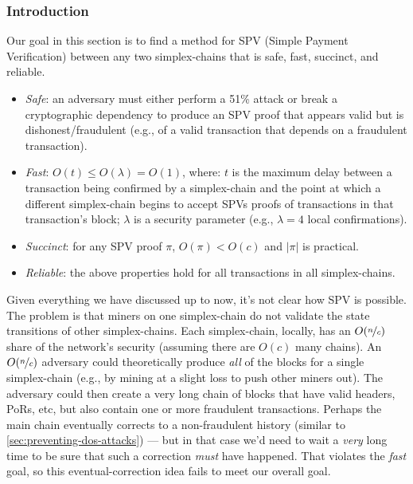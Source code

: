 
%
%

\subsubsection{Introduction}

Our goal in this section is to find a method for SPV (Simple Payment Verification) between any two simplex-chains that is safe, fast, succinct, and reliable.
\begin{itemize}
    \item \emph{Safe}: an adversary must either perform a 51\% attack or break a cryptographic dependency to produce an SPV proof that appears valid but is dishonest/fraudulent (e.g., of a valid transaction that depends on a fraudulent transaction).
    \item \emph{Fast}: $O(t) \le O(\lambda) = O(1)$, where: $t$ is the maximum delay between a transaction being confirmed by a simplex-chain and the point at which a different simplex-chain begins to accept SPVs proofs of transactions in that transaction's block; $\lambda$ is a security parameter (e.g., $\lambda = 4$ local confirmations).
    \item \emph{Succinct}: for any SPV proof $\pi$, $O(\pi) < O(c)$ and $|\pi|$ is practical.
    \item \emph{Reliable}: the above properties hold for all transactions in all simplex-chains.
\end{itemize}


Given everything we have discussed up to now, it's not clear how SPV is possible.
The problem is that miners on one simplex-chain do not validate the state transitions of other simplex-chains.
Each simplex-chain, locally, has an $O(\nicefrac{n}{c})$ share of the network's security (assuming there are $O(c)$ many chains).
An $O(\nicefrac{n}{c})$ adversary could theoretically produce \emph{all} of the blocks for a single simplex-chain (e.g., by mining at a slight loss to push other miners out).
The adversary could then create a very long chain of blocks that have valid headers, PoRs, etc, but also contain one or more fraudulent transactions.
Perhaps the main chain eventually corrects to a non-fraudulent history (similar to \autoref{sec:preventing-dos-attacks}) --- but in that case we'd need to wait a \emph{very} long time to be sure that such a correction \emph{must} have happened.
That violates the \emph{fast} goal, so this eventual-correction idea fails to meet our overall goal.

